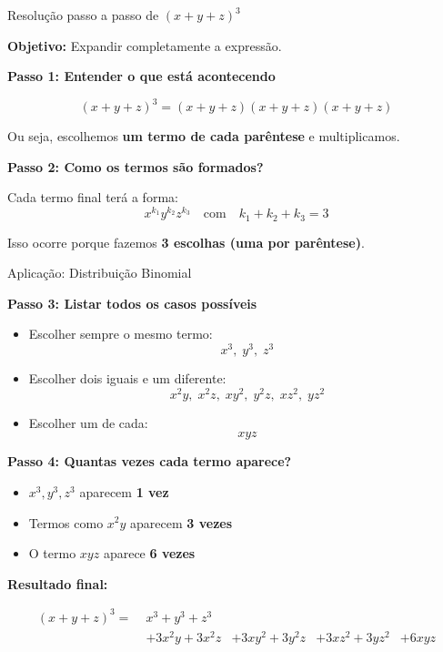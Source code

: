 \documentclass[9pt]{beamer}
\begin{document}
\begin{frame}{Resolução passo a passo de $(x + y + z)^3$}

\textbf{Objetivo:} Expandir completamente a expressão.

\vspace{0.3cm}

\textbf{Passo 1: Entender o que está acontecendo}

\[
(x + y + z)^3 = (x + y + z)(x + y + z)(x + y + z)
\]

Ou seja, escolhemos \textbf{um termo de cada parêntese} e multiplicamos.

\vspace{0.4cm}

\textbf{Passo 2: Como os termos são formados?}

Cada termo final terá a forma:
\[
x^{k_1}y^{k_2}z^{k_3}
\quad \text{com} \quad k_1 + k_2 + k_3 = 3
\]

Isso ocorre porque fazemos \textbf{3 escolhas (uma por parêntese)}.

\vspace{0.4cm}


\end{frame}
\begin{frame}{Aplicação: Distribuição Binomial}

\textbf{Passo 3: Listar todos os casos possíveis}

\begin{itemize}
    \item Escolher sempre o mesmo termo:
    \[
    x^3,\; y^3,\; z^3
    \]

    \item Escolher dois iguais e um diferente:
    \[
    x^2y,\; x^2z,\; xy^2,\; y^2z,\; xz^2,\; yz^2
    \]

    \item Escolher um de cada:
    \[
    xyz
    \]
\end{itemize}

\vspace{0.4cm}

\textbf{Passo 4: Quantas vezes cada termo aparece?}

\begin{itemize}
    \item $x^3, y^3, z^3$ aparecem \textbf{1 vez}
    \item Termos como $x^2y$ aparecem \textbf{3 vezes}
    \item O termo $xyz$ aparece \textbf{6 vezes}
\end{itemize}

\vspace{0.4cm}

\textbf{Resultado final:}

\[
\begin{aligned}
(x + y + z)^3 =\;& x^3 + y^3 + z^3 \\
&+ 3x^2y + 3x^2z 
&+ 3xy^2 + 3y^2z 
&+ 3xz^2 + 3yz^2 
&+ 6xyz
\end{aligned}
\]
\end{frame}
\end{document}
